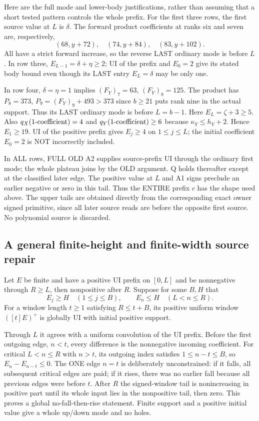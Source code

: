Here are the full mode and lower-body justifications, rather than
assuming that a short tested pattern controls the whole prefix.
For the first three rows, the first source value at $L$ is $\delta$.
The forward product coefficients at ranks six and seven are,
respectively,
\[
 (68,y+72),\quad(74,y+84),\quad(83,y+102).
\]
All have a strict forward increase, so the reverse LAST ordinary
mode is before $L$. In row three, $E_{L-1}=\delta+\eta\ge2$;
UI of the prefix and $E_0=2$ give its stated body bound even
though its LAST entry $E_L=\delta$ may be only one.

In row four, $\delta=\eta=1$ implies
$(F_Y)_7=63$, $(F_Y)_8=125$. The product has
$P_8=373$, $P_9=(F_Y)_9+493>373$ since $b\ge21$ puts rank
nine in the actual support. Thus its LAST ordinary mode is
before $L=b-1$. Here $E_L=\zeta+3\ge5$.
Also $q_X(1\hbox{-coefficient})=4$ and $q_Y(1\hbox{-coefficient})\ge6$
because $\kappa_Y\le h_Y+2$. Hence $E_1\ge19$.
UI of the positive prefix gives $E_j\ge4$ on $1\le j\le L$;
the initial coefficient $E_0=2$ is NOT incorrectly included.

In ALL rows, FULL OLD A2 supplies source-prefix UI through the
ordinary first mode; the whole plateau joins by the OLD argument.
Q holds thereafter except at the classified later edge. The positive
value at $L$ and A1 signs preclude an earlier negative or zero
in this tail. Thus the ENTIRE prefix $c$ has the shape used above.
The upper tails are obtained directly from the corresponding exact
owner signed primitive, since all later source reads are before
the opposite first source. No polynomial source is discarded.

\subsection{A general finite-height and finite-width source repair}
Let $E$ be finite and have a positive UI prefix on $[0,L]$ and be nonnegative
through $R\ge L$, then nonpositive after $R$. Suppose for some
$B,H$ that
\[
 E_j\ge H\quad(1\le j\le B),\qquad
 E_n\le H\quad(L<n\le R).
\]
For a window length $t\ge1$ satisfying $R\le t+B$, its positive
uniform window $([t]E)^+$ is globally UI with initial positive support.

Through $L$ it agrees with a uniform convolution of the UI prefix.
Before the first outgoing edge, $n<t$, every difference is
the nonnegative incoming coefficient. For critical $L<n\le R$
with $n>t$, its outgoing index satisfies $1\le n-t\le B$,
so $E_n-E_{n-t}\le0$.
The ONE edge $n=t$ is deliberately unconstrained: if it falls,
all subsequent critical edges are paid; if it rises, there was
no earlier fall because all previous edges were before $t$.
After $R$ the signed-window tail is nonincreasing in positive
part until its whole input lies in the nonpositive tail, then zero.
This proves a global no-fall-then-rise statement. Finite support
and a positive initial value give a whole up/down mode and no holes.

